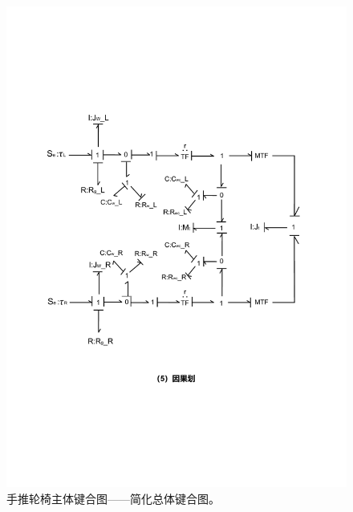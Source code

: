 	\begin{figure}[!h]
		\centering
		\includegraphics[width=1\textwidth,angle=90]{fig/part1_bond.pdf}
		\caption{手推轮椅主体键合图——简化总体键合图。}\label{fig:part1_bond}
	\end{figure}

